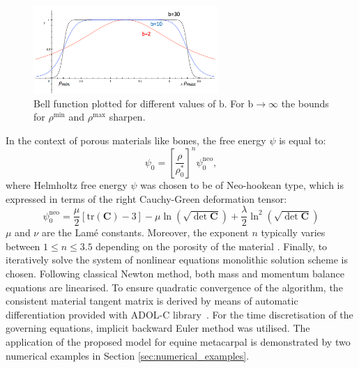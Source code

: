 \documentclass[11pt]{ACMEarticle}
\numberwithin{equation}{section}
\begin{document}
\begin{figure}[h!]
	\begin{centering}
		\includegraphics[width=7cm]{Figures/graphs/bell_func}
		\caption{Bell function plotted for different values of $\mathrm b$. For $\mathrm b \rightarrow \infty$ the bounds for $ \rho{^\mathrm{min}}$ and $ \rho{^\mathrm{max}}$ sharpen.}
		\label{fig:bell_func}
	\end{centering}
\end{figure}
In the context of porous materials like bones, the free energy $\psi$ is equal to:
\begin{equation}
\psi_{0}=\left[\frac{\rho}{\rho_{0}^{\ast}}\right]^{n}\psi_{0}^{\mathrm{neo}},
\label{eq:free_energ}
\end{equation}
where Helmholtz free energy $\psi$ was chosen to be of Neo-hookean type, which is expressed in terms of the right Cauchy-Green deformation tensor: 
\begin{equation}
\psi_{0}^{\mathrm{neo}}=\frac{\mu}{2}\left[\textrm{tr}(\mathbf{C})-3\right]-\mu\ln(\sqrt{\det\mathbf{C}})+\frac{\lambda}{2}\ln^{2}(\sqrt{\det\mathbf{C}})
\end{equation}
$\mu$ and $\nu$ are the Lam\'e constants. Moreover, the exponent $n$ typically varies between $1 \leq n \leq 3.5$ depending on the porosity of the material \citep{Gibson2005}.
Finally, to iteratively solve the system of nonlinear equations monolithic solution scheme is chosen. Following classical Newton method, both mass and momentum balance equations are linearised. To ensure quadratic convergence of the algorithm, the consistent material tangent matrix is derived by means of automatic differentiation provided with ADOL-C library~\citep{Walther2009}. For the time discretisation of the governing equations, implicit backward Euler method was utilised. The application of the proposed model for equine metacarpal is demonstrated by two numerical examples in Section \ref{sec:numerical_examples}.
\end{document}
